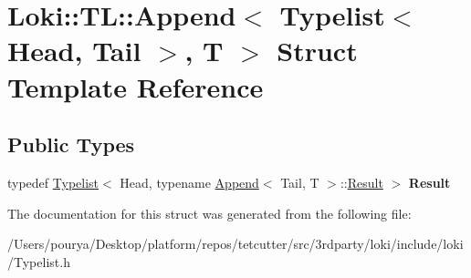 \hypertarget{structLoki_1_1TL_1_1Append_3_01Typelist_3_01Head_00_01Tail_01_4_00_01T_01_4}{}\section{Loki\+:\+:T\+L\+:\+:Append$<$ Typelist$<$ Head, Tail $>$, T $>$ Struct Template Reference}
\label{structLoki_1_1TL_1_1Append_3_01Typelist_3_01Head_00_01Tail_01_4_00_01T_01_4}
\subsection*{Public Types}
\begin{DoxyCompactItemize}
\item 
\hypertarget{structLoki_1_1TL_1_1Append_3_01Typelist_3_01Head_00_01Tail_01_4_00_01T_01_4_af3ded7594034fd8c9c2b315407c27b62}{}typedef \hyperlink{structLoki_1_1Typelist}{Typelist}$<$ Head, typename \hyperlink{structLoki_1_1TL_1_1Append}{Append}$<$ Tail, T $>$\+::\hyperlink{structLoki_1_1Typelist}{Result} $>$ {\bfseries Result}\label{structLoki_1_1TL_1_1Append_3_01Typelist_3_01Head_00_01Tail_01_4_00_01T_01_4_af3ded7594034fd8c9c2b315407c27b62}

\end{DoxyCompactItemize}


The documentation for this struct was generated from the following file\+:\begin{DoxyCompactItemize}
\item 
/\+Users/pourya/\+Desktop/platform/repos/tetcutter/src/3rdparty/loki/include/loki/Typelist.\+h\end{DoxyCompactItemize}
